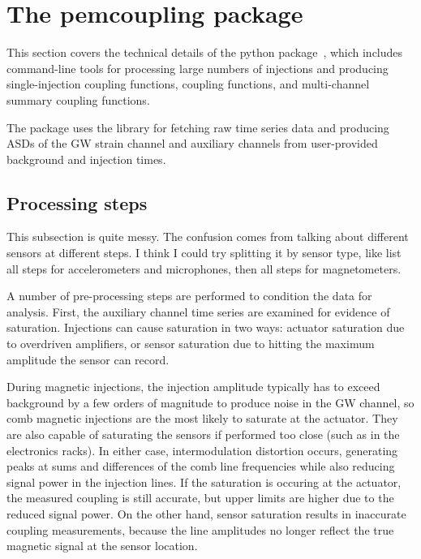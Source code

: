\section{The {\selectfont pemcoupling}\xspace package}

This section covers the technical details of the \pemcoupling python package~\citep{pem_code}, which includes command-line tools for processing large numbers of injections and producing single-injection coupling functions, coupling functions, and multi-channel summary coupling functions.

The package uses the  library for fetching raw time series data and producing \acp{ASD} of the \ac{GW} strain channel and auxiliary channels from user-provided background and injection times.

\subsection{Processing steps}

{\color{red}
This subsection is quite messy.
The confusion comes from talking about different sensors at different steps.
I think I could try splitting it by sensor type, like list all steps for accelerometers and microphones, then all steps for magnetometers.}

A number of pre-processing steps are performed to condition the data for analysis.
First, the auxiliary channel time series are examined for evidence of saturation.
Injections can cause saturation in two ways: actuator saturation due to overdriven amplifiers, or sensor saturation due to hitting the maximum amplitude the sensor can record.

During magnetic injections, the injection amplitude typically has to exceed background by a few orders of magnitude to produce noise in the \ac{GW} channel, so comb magnetic injections are the most likely to saturate at the actuator.
They are also capable of saturating the sensors if performed too close (such as in the electronics racks).
In either case, intermodulation distortion occurs, generating peaks at sums and differences of the comb line frequencies while also reducing signal power in the injection lines.
If the saturation is occuring at the actuator, the measured coupling is still accurate, but upper limits are higher due to the reduced signal power.
On the other hand, sensor saturation results in inaccurate coupling measurements, because the line amplitudes no longer reflect the true magnetic signal at the sensor location.

